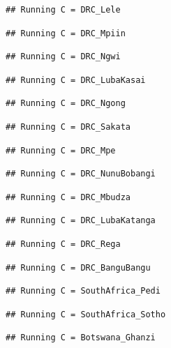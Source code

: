 \documentclass[
]{article}
\begin{document}
\begin{verbatim}
## Running C = DRC_Lele
\end{verbatim}

\begin{verbatim}
## Running C = DRC_Mpiin
\end{verbatim}

\begin{verbatim}
## Running C = DRC_Ngwi
\end{verbatim}

\begin{verbatim}
## Running C = DRC_LubaKasai
\end{verbatim}

\begin{verbatim}
## Running C = DRC_Ngong
\end{verbatim}

\begin{verbatim}
## Running C = DRC_Sakata
\end{verbatim}

\begin{verbatim}
## Running C = DRC_Mpe
\end{verbatim}

\begin{verbatim}
## Running C = DRC_NunuBobangi
\end{verbatim}

\begin{verbatim}
## Running C = DRC_Mbudza
\end{verbatim}

\begin{verbatim}
## Running C = DRC_LubaKatanga
\end{verbatim}

\begin{verbatim}
## Running C = DRC_Rega
\end{verbatim}

\begin{verbatim}
## Running C = DRC_BanguBangu
\end{verbatim}

\begin{verbatim}
## Running C = SouthAfrica_Pedi
\end{verbatim}

\begin{verbatim}
## Running C = SouthAfrica_Sotho
\end{verbatim}

\begin{verbatim}
## Running C = Botswana_Ghanzi
\end{verbatim}
\end{document}
